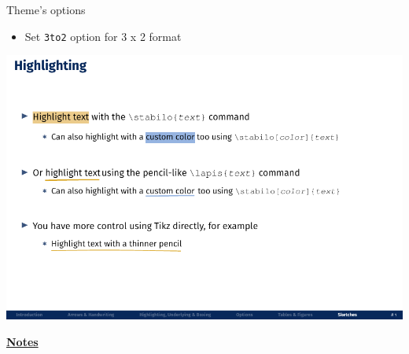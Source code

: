 \documentclass[10pt]{beamer}
\begin{document}
\begin{frame}
    {Theme's options}
    \begin{itemize}
        \item Set \texttt{3to2} option for 3 x 2 format 
    \end{itemize}
    \begin{center}
        \begin{minipage}[b]{.5\textwidth}
            \includegraphics[width=\textwidth]{3to2}
        \end{minipage}
    \end{center}
\end{frame}
\begin{flushleft}
    \underline{\textbf{Notes}}\setlength{\parskip}{.15cm}\notesize\newline\par
\end{flushleft}
\end{document}
